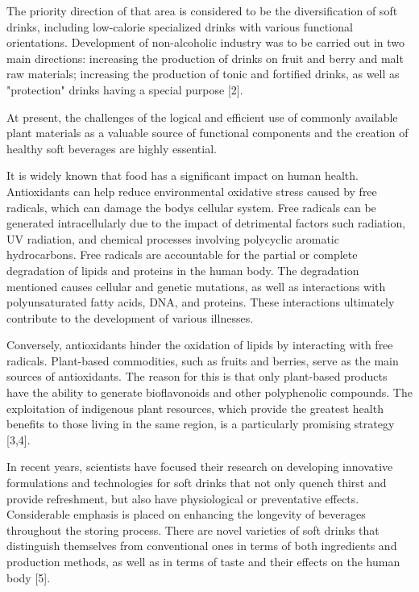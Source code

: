 The priority direction of that area is considered to be the
diversification of soft drinks, including low-calorie specialized drinks
with various functional orientations. Development of non-alcoholic
industry was to be carried out in two main directions: increasing the
production of drinks on fruit and berry and malt raw materials;
increasing the production of tonic and fortified drinks, as well as
"protection" drinks having a special purpose {[}2{]}.

At present, the challenges of the logical and efficient use of commonly
available plant materials as a valuable source of functional components
and the creation of healthy soft beverages are highly essential.

It is widely known that food has a significant impact on human health.
Antioxidants can help reduce environmental oxidative stress caused by
free radicals, which can damage the body\textquotesingle s cellular
system. Free radicals can be generated intracellularly due to the impact
of detrimental factors such radiation, UV radiation, and chemical
processes involving polycyclic aromatic hydrocarbons. Free radicals are
accountable for the partial or complete degradation of lipids and
proteins in the human body. The degradation mentioned causes cellular
and genetic mutations, as well as interactions with polyunsaturated
fatty acids, DNA, and proteins. These interactions ultimately contribute
to the development of various illnesses.

Conversely, antioxidants hinder the oxidation of lipids by interacting
with free radicals. Plant-based commodities, such as fruits and berries,
serve as the main sources of antioxidants. The reason for this is that
only plant-based products have the ability to generate bioflavonoids and
other polyphenolic compounds. The exploitation of indigenous plant
resources, which provide the greatest health benefits to those living in
the same region, is a particularly promising strategy {[}3,4{]}.

In recent years, scientists have focused their research on developing
innovative formulations and technologies for soft drinks that not only
quench thirst and provide refreshment, but also have physiological or
preventative effects. Considerable emphasis is placed on enhancing the
longevity of beverages throughout the storing process. There are novel
varieties of soft drinks that distinguish themselves from conventional
ones in terms of both ingredients and production methods, as well as in
terms of taste and their effects on the human body {[}5{]}.~


